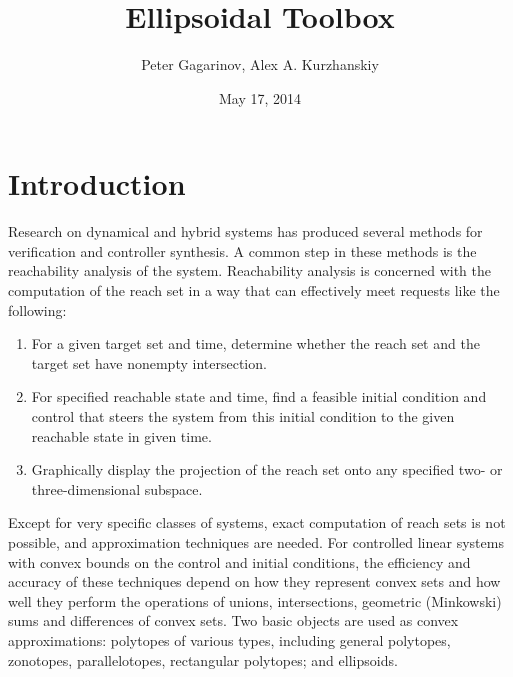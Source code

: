 \documentclass[letterpaper,10pt,english]{sphinxmanual}
\title{Ellipsoidal Toolbox}
\date{May 17, 2014}
\author{Peter Gagarinov, Alex A. Kurzhanskiy}
\begin{document}
\maketitle
\tableofcontents
{}\label{main_manual::doc}



\chapter{Introduction}
\label{chap_intro:introduction}\label{chap_intro::doc}\label{chap_intro:welcome-to-ellipsoidal-toolbox-documentation}
Research on dynamical and hybrid systems has produced several methods
for verification and controller synthesis. A common step in these
methods is the reachability analysis of the system. Reachability
analysis is concerned with the computation of the reach set in a way
that can effectively meet requests like the following:
\begin{enumerate}
\item {} 
For a given target set and time, determine whether the reach set and
the target set have nonempty intersection.

\item {} 
For specified reachable state and time, find a feasible initial
condition and control that steers the system from this initial
condition to the given reachable state in given time.

\item {} 
Graphically display the projection of the reach set onto any
specified two- or three-dimensional subspace.

\end{enumerate}

Except for very specific classes of systems, exact computation of reach
sets is not possible, and approximation techniques are needed. For
controlled linear systems with convex bounds on the control and initial
conditions, the efficiency and accuracy of these techniques depend on
how they represent convex sets and how well they perform the operations
of unions, intersections, geometric (Minkowski) sums and differences of
convex sets. Two basic objects are used as convex approximations:
polytopes of various types, including general polytopes, zonotopes,
parallelotopes, rectangular polytopes; and ellipsoids.
\end{document}
